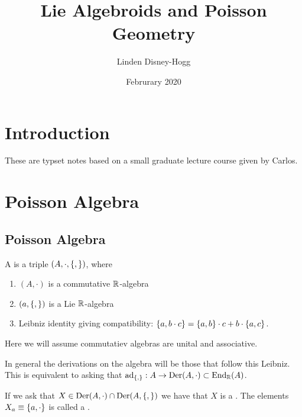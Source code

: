 \documentclass{article}
\title{Lie Algebroids and Poisson Geometry}
\author{Linden Disney-Hogg}
\date{Februrary 2020}
\begin{document}
\maketitle
\tableofcontents

\section{Introduction}
These are typset notes based on a small graduate lecture course given by Carlos.

\section{Poisson Algebra}

\subsection{Poisson Algebra}

\begin{definition}
A  is a triple $(A, \cdot , \acomm[]{})$, where 
\begin{enumerate}
    \item $(A,\cdot)$ is a commutative $\mbb{R}$-algebra
    \item $(a, \acomm[]{})$ is a Lie $\mbb{R}$-algebra
    \item Leibniz identity giving compatibility: $\acomm[a]{b\cdot c} = \acomm[a]{b}\cdot c + b \cdot \acomm[a]{c}$. 
\end{enumerate}
\end{definition}

\begin{remark}
Here we will assume commutatiev algebras are unital and associative. 
\end{remark}

\begin{remark}
In general the derivations on the algebra will be those that follow this Leibniz. This is equivalent to asking that $\ad_{\acomm[]{}}: A \to \Der(A, \cdot) \subset \End_{\mbb{R}}(A)$. 
\end{remark}

If we ask that $X \in \Der(A, \cdot) \cap \Der(A, \acomm[]{})$ we have that $X$ is a . The elements $X_a \equiv \acomm[a]{\cdot}$ is called a . 
\end{document}
